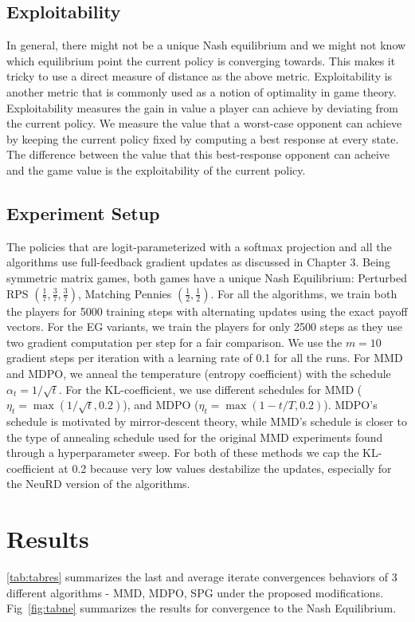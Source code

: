 \subsection{Exploitability}
In general, there might not be a unique Nash equilibrium and we might not know which equilibrium
point the current policy is converging towards.
This makes it tricky to use a direct measure of distance as the above metric.
Exploitability is another metric that is commonly used as a notion of optimality in game theory.
Exploitability measures the gain in value a player can achieve by deviating from the current
policy.
We measure the value that a worst-case opponent can achieve by keeping the current policy fixed by
computing a best response at every state.
The difference between the value that this best-response opponent can acheive and the game value is
the exploitability of the current policy.


\subsection{Experiment Setup}
The policies that are logit-parameterized with a softmax projection and all the algorithms use
full-feedback gradient updates as discussed in Chapter 3.
Being symmetric matrix games, both games have a unique Nash Equilibrium: Perturbed RPS
$(\frac{1}{7}, \frac{3}{7}, \frac{3}{7})$, Matching Pennies $(\frac{1}{2}, \frac{1}{2})$.
For all the algorithms, we train both the players for 5000 training steps with alternating updates
using the exact payoff vectors.
For the EG variants, we train the players for only 2500 steps as they use two gradient computation
per step for a fair comparison.
We use the $m=10$ gradient steps per iteration with a learning rate of 0.1 for all the runs.
For MMD and MDPO, we anneal the temperature (entropy coefficient) with the schedule $\alpha_t =
	1/\sqrt{t}$.
For the KL-coefficient, we use different schedules for MMD ($\eta_t = \max(1 / \sqrt{t}, 0.2)$),
and MDPO ($\eta_t = \max(1 - t/T, 0.2)$).
MDPO's schedule is motivated by mirror-descent theory, while MMD's schedule is closer to the type
of annealing schedule used for the original MMD experiments found through a hyperparameter sweep.
For both of these methods we cap the KL-coefficient at 0.2 because very low values destabilize
the updates, especially for the NeuRD version of the algorithms.

\section{Results} \ref{tab:tabres} summarizes the last and average
iterate convergences behaviors of 3 different algorithms - MMD, MDPO, SPG under the proposed
modifications.
Fig~\ref{fig:tabne} summarizes the results for convergence to the Nash Equilibrium.

